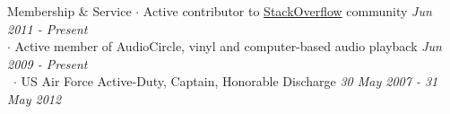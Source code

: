 
\begin{rSection}{Membership \& Service}
  $\cdot$ Active contributor to 
  \href{http://stackoverflow.com/users/822162/clayton-stanley}{StackOverflow}
  community \hfill {\em Jun 2011 - Present} \\
  $\cdot$ Active member of
  AudioCircle,
  vinyl and computer-based audio playback
  \hfill {\em Jun 2009 - Present} \\
  ~$\cdot$ US Air Force Active-Duty, Captain, Honorable Discharge
  \hfill {\em 30 May 2007 - 31 May 2012}
\end{rSection}

